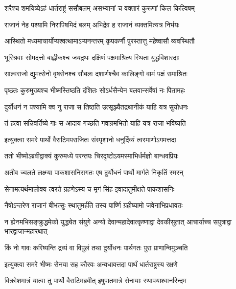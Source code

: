 \twolineshloka
{शरैश्च शमयिष्येऽहं धार्तराष्ट्रं ससौबलम्}
{असभ्यानां च वक्तारं कुरूणां किल किल्विषम्}


\twolineshloka
{राजानं नेह पश्यामि निरापिषमिदं बलम्}
{अभिद्रेव ह राजानं व्यक्तमित्यत्र निर्भयः}


\twolineshloka
{आस्थितो मध्यमाचार्योप्यश्वत्थामाऽप्यनन्तरम्}
{कृपकर्णौ पुरस्तात्तु महेष्वासौ व्यवस्थितौ}


\twolineshloka
{भूरिश्रवाः सोमदत्तो बाह्लीकश्च जयद्रथः}
{दक्षिणं पक्षमाश्रित्य स्थिता युद्धविशारदाः}


\twolineshloka
{साल्वराजो द्युमत्सेनो वृषसेनश्च सौबलः}
{दशार्णश्चैव कालिङ्गो वामं पक्षं समाश्रितः}


\twolineshloka
{पृष्ठतः कुरुमुख्यश्च भीष्मस्तिष्ठति दंशितः}
{सोऽर्धसैन्येन बलवान्सर्वेषां नः पितामहः}


\twolineshloka
{दुर्योधनं न पश्यामि क्व नु राजा स तिष्ठति}
{उत्सृञ्ज्यैतद्रथानीकं याहि यत्र सुयोधनः}


\twolineshloka
{तं हत्वा सन्निवर्तिष्ये गाः स आदाय गच्छति}
{गवाग्रमभितो याहि यत्र राजा भविष्यति}



\twolineshloka
{इत्युक्त्वा समरे पार्थो वैराटिमपराजितः}
{संस्पृशानो धनुर्दिव्यं त्वरमाणोऽगमत्तदा}


\twolineshloka
{ततो भीष्मोऽब्रवीद्वाक्यं कुरुमध्ये परन्तपः}
{चिरदृष्टोऽयमस्माभिर्धर्मज्ञो बान्धवप्रियः}



\twolineshloka
{अतीव ज्वलते लक्ष्म्या पाकशासनिरागतः}
{एष दुर्योधनं पार्थो मार्गते निकृतिं स्मरन्}


\twolineshloka
{सेनामत्यर्थमालोक्य त्वरते ग्रहणेऽस्य च}
{मृगं सिंह इवादातुमीक्षते पाकशासनिः}


\twolineshloka
{नैषोऽन्तरेण राजानं बीभत्सुः स्थातुमर्हति}
{तस्य पार्ष्णि ग्रहीष्यामो जवेनाभिप्रधावतः}


\threelineshloka
{न ह्येनमभिसङ्क्रुद्धमेको युद्ध्येत संयुगे}
{अन्यो देवान्महादेवात्कृष्णाद्वा देवकीसुतात्}
{आचार्याच्च सपुत्राद्वा भारद्वाजान्महारथात्}


\twolineshloka
{किं नो गावः करिष्यन्ति द्रव्यं वा विपुलं तथा}
{दुर्योधनः पार्थगतः पुरा प्राणान्विमुञ्चति}



\twolineshloka
{इत्युक्त्वा समरे भीष्मः सेनया सह कौरवः}
{अन्वधावत्तदा पार्थं धार्तराष्ट्रस्य रक्षणे}


\twolineshloka
{विक्रोशमात्रं यात्वा तु पार्थो वैराटिमब्रवीत्}
{इषुपातमात्रे सेनायाः स्थापयाश्वानरिन्दम}


